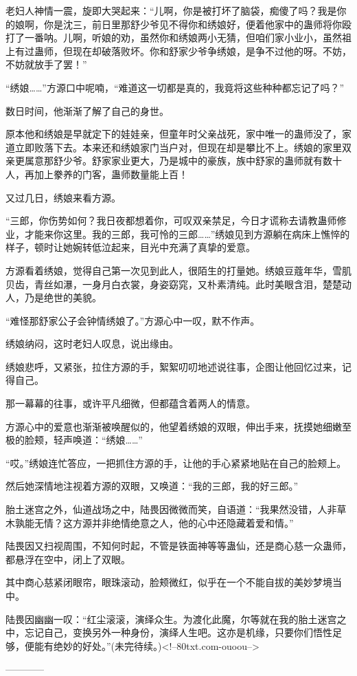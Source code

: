 \begin{this_body}
老妇人神情一震，旋即大哭起来：“儿啊，你是被打坏了脑袋，痴傻了吗？我是你的娘啊，你是沈三，前日里那舒少爷见不得你和绣娘好，便着他家中的蛊师将你殴打了一番呐。儿啊，听娘的劝，虽然你和绣娘两小无猜，但咱们家小业小，虽然祖上有过蛊师，但现在却破落败坏。你和舒家少爷争绣娘，是争不过他的呀。不妨，不妨就放手了罢！”

“绣娘……”方源口中呢喃，“难道这一切都是真的，我竟将这些种种都忘记了吗？”

数日时间，他渐渐了解了自己的身世。

原本他和绣娘是早就定下的娃娃亲，但童年时父亲战死，家中唯一的蛊师没了，家道立即败落下去。本来还和绣娘家门当户对，但现在却是攀比不上。绣娘的家里双亲更属意那舒少爷。舒家家业更大，乃是城中的豪族，族中舒家的蛊师就有数十人，再加上豢养的门客，蛊师数量能上百！

又过几日，绣娘来看方源。

“三郎，你伤势如何？我日夜都想着你，可叹双亲禁足，今日才谎称去请教蛊师修业，才能来你这里。我的三郎，我可怜的三郎……”绣娘见到方源躺在病床上憔悴的样子，顿时让她婉转低泣起来，目光中充满了真挚的爱意。

方源看着绣娘，觉得自己第一次见到此人，很陌生的打量她。绣娘豆蔻年华，雪肌贝齿，青丝如瀑，一身月白衣裳，身姿窈窕，又朴素清纯。此时美眼含泪，楚楚动人，乃是绝世的美貌。

“难怪那舒家公子会钟情绣娘了。”方源心中一叹，默不作声。

绣娘纳闷，这时老妇人叹息，说出缘由。

绣娘悲呼，又紧张，拉住方源的手，絮絮叨叨地述说往事，企图让他回忆过来，记得自己。

那一幕幕的往事，或许平凡细微，但都蕴含着两人的情意。

方源心中的爱意也渐渐被唤醒似的，他望着绣娘的双眼，伸出手来，抚摸她细嫩至极的脸颊，轻声唤道：“绣娘……”

“哎。”绣娘连忙答应，一把抓住方源的手，让他的手心紧紧地贴在自己的脸颊上。

然后她深情地注视着方源的双眼，又唤道：“我的三郎，我的好三郎。”

胎土迷宫之外，仙道战场之中，陆畏因微微而笑，自语道：“我果然没错，人非草木孰能无情？这方源并非绝情绝意之人，他的心中还隐藏着爱和情。”

陆畏因又扫视周围，不知何时起，不管是铁面神等等蛊仙，还是商心慈一众蛊师，都悬浮在空中，闭上了双眼。

其中商心慈紧闭眼帘，眼珠滚动，脸颊微红，似乎在一个不能自拔的美妙梦境当中。

陆畏因幽幽一叹：“红尘滚滚，演绎众生。为渡化此魔，尔等就在我的胎土迷宫之中，忘记自己，变换另外一种身份，演绎人生吧。这亦是机缘，只要你们悟性足够，便能有绝妙的好处。”(未完待续。)<!--80txt.com-ouoou-->

------------

\end{this_body}


